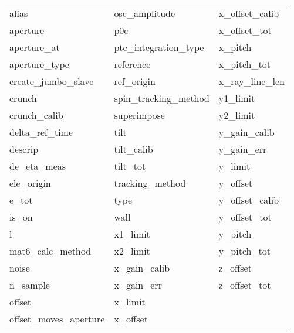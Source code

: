  \begin{tabular}{lll} \toprule
alias                       & osc_amplitude               & x_offset_calib              \\
aperture                    & p0c                         & x_offset_tot                \\
aperture_at                 & ptc_integration_type        & x_pitch                     \\
aperture_type               & reference                   & x_pitch_tot                 \\
create_jumbo_slave          & ref_origin                  & x_ray_line_len              \\
crunch                      & spin_tracking_method        & y1_limit                    \\
crunch_calib                & superimpose                 & y2_limit                    \\
delta_ref_time              & tilt                        & y_gain_calib                \\
descrip                     & tilt_calib                  & y_gain_err                  \\
de_eta_meas                 & tilt_tot                    & y_limit                     \\
ele_origin                  & tracking_method             & y_offset                    \\
e_tot                       & type                        & y_offset_calib              \\
is_on                       & wall                        & y_offset_tot                \\
l                           & x1_limit                    & y_pitch                     \\
mat6_calc_method            & x2_limit                    & y_pitch_tot                 \\
noise                       & x_gain_calib                & z_offset                    \\
n_sample                    & x_gain_err                  & z_offset_tot                \\
offset                      & x_limit                     &                             \\
offset_moves_aperture       & x_offset                    &                             \\
 \bottomrule
 \end{tabular}
 \vfill
 
